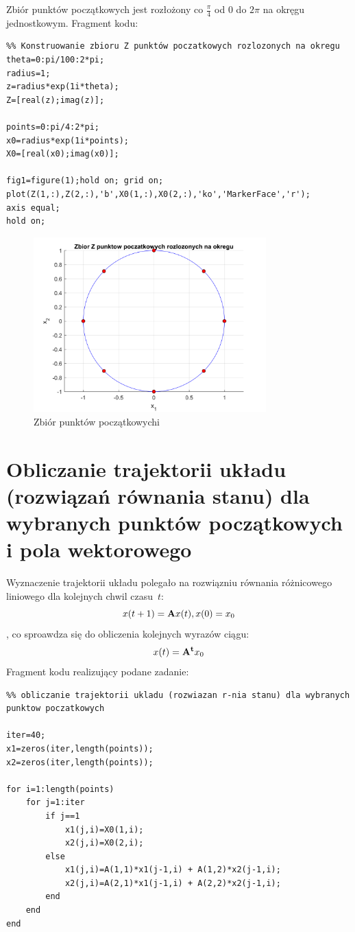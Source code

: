 \documentclass{article}
\begin{document}
Zbiór punktów początkowych jest rozłożony co $\frac{\pi}{4}$ od 0 do $2\pi$ na okręgu jednostkowym.
Fragment kodu:
\begin{verbatim}
%% Konstruowanie zbioru Z punktów poczatkowych rozlozonych na okregu
theta=0:pi/100:2*pi;
radius=1;
z=radius*exp(1i*theta);
Z=[real(z);imag(z)];

points=0:pi/4:2*pi;
x0=radius*exp(1i*points);
X0=[real(x0);imag(x0)];

fig1=figure(1);hold on; grid on;
plot(Z(1,:),Z(2,:),'b',X0(1,:),X0(2,:),'ko','MarkerFace','r');
axis equal;
hold on;
\end{verbatim}
\begin{figure}[H]
	\centering
	\includegraphics[width=0.8\textwidth]{zbior_punktow_poczatkowych.png}
	\caption{Zbiór punktów początkowychi}
	\label{fig::punkty_początkowe}
\end{figure}

\section{Obliczanie trajektorii układu (rozwiązań równania stanu) dla wybranych punktów początkowych i pola wektorowego}

Wyznaczenie trajektorii układu polegało na rozwiązniu równania różnicowego liniowego dla kolejnych chwil czasu~$t$:
\[
x(t+1) = \bold{A}x(t), x(0)=x_0
\]
, co sproawdza się do obliczenia kolejnych wyrazów ciągu:
\[
x(t) = \bold{A^t}x_0
\]
Fragment kodu realizujący podane zadanie:
\begin{verbatim}
%% obliczanie trajektorii ukladu (rozwiazan r-nia stanu) dla wybranych punktow poczatkowych

iter=40;
x1=zeros(iter,length(points));
x2=zeros(iter,length(points));

for i=1:length(points)
    for j=1:iter
        if j==1
            x1(j,i)=X0(1,i);
            x2(j,i)=X0(2,i);
        else
            x1(j,i)=A(1,1)*x1(j-1,i) + A(1,2)*x2(j-1,i);
            x2(j,i)=A(2,1)*x1(j-1,i) + A(2,2)*x2(j-1,i);
        end
    end
end
\end{verbatim}
\end{document}
